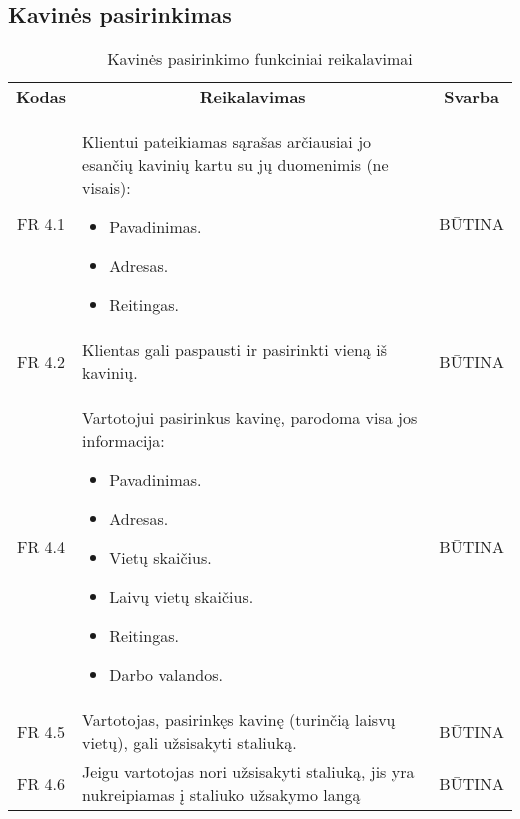 \documentclass{VUMIFPSkursinis}
\begin{document}
\subsection{Kavinės pasirinkimas}

\begin{center}
	\begin{table}[H]
	\begin{tabular}{|p{2cm}|p{}|p{}|}
	
	\hline
	    \rowcolor{lightgray}
		\multicolumn{3}{|c|}{Kavinės pasirinkimas}\\
		
	\hline
		\multicolumn{1}{|c|}{{\bfseries Kodas}}&
		\multicolumn{1}{|c|}{{\bfseries Reikalavimas}}&
		\multicolumn{1}{|c|}{{\bfseries Svarba}}\\

	\hline
	
		\multicolumn{1}{|c|}{FR 4.1}&
		{Klientui pateikiamas sąrašas arčiausiai jo esančių kavinių kartu su jų duomenimis (ne visais):
		\begin{itemize}
			\item Pavadinimas.
			\item Adresas.
			\item Reitingas.
		\end{itemize}}&
		\multicolumn{1}{|c|}{BŪTINA}\\	
		
	\hline
	
		\multicolumn{1}{|c|}{FR 4.2}&
		{Klientas gali paspausti ir pasirinkti vieną iš kavinių.}&
		\multicolumn{1}{|c|}{BŪTINA}\\
		
	\hline
	
		\multicolumn{1}{|c|}{FR 4.4}&
		{Vartotojui pasirinkus kavinę, parodoma visa jos informacija:
		\begin{itemize}
			\item Pavadinimas.
			\item Adresas.
			\item Vietų skaičius.
			\item Laivų vietų skaičius.
			\item Reitingas.
			\item Darbo valandos.
		\end{itemize}}&
		\multicolumn{1}{|c|}{BŪTINA}\\
		
	\hline
	
		\multicolumn{1}{|c|}{FR 4.5}&
		{Vartotojas, pasirinkęs kavinę (turinčią laisvų vietų), gali užsisakyti staliuką.}&
		\multicolumn{1}{|c|}{BŪTINA}\\
	\hline
	
		\multicolumn{1}{|c|}{FR 4.6}&
		{Jeigu vartotojas nori užsisakyti staliuką, jis yra nukreipiamas į staliuko užsakymo langą}&
		\multicolumn{1}{|c|}{BŪTINA}\\				
	\hline
	
	\end{tabular}		
	\caption{Kavinės pasirinkimo funkciniai reikalavimai}
	\label{table:KavinėsPasirinkimas}
	\end{table}


\end{center}
\end{document}
